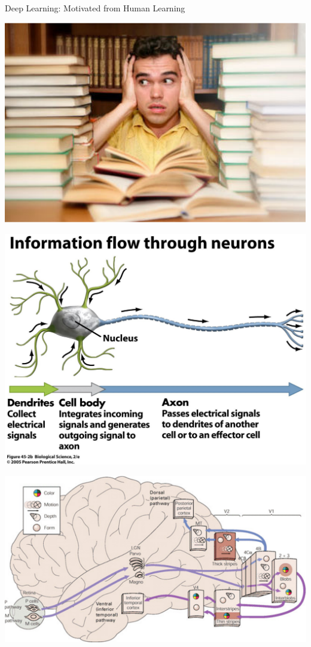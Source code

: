 \documentclass{beamer}
\begin{document}
\begin{frame}{Deep Learning: Motivated from Human Learning}

    \vfill

     \centering
     \begin{minipage}{0.32\textwidth}
         \centering
         \includegraphics[width=0.9\columnwidth]{studying.pdf}
     \end{minipage}
     \hfill
     \begin{minipage}{0.32\textwidth}
         \centering
         \includegraphics[width=0.9\columnwidth]{neuron.pdf}
     \end{minipage}
     \hfill
     \begin{minipage}{0.32\textwidth}
         \centering
         \includegraphics[width=0.9\columnwidth]{visual_pathway.pdf}
         \\
     \end{minipage}


\end{frame}
\end{document}
